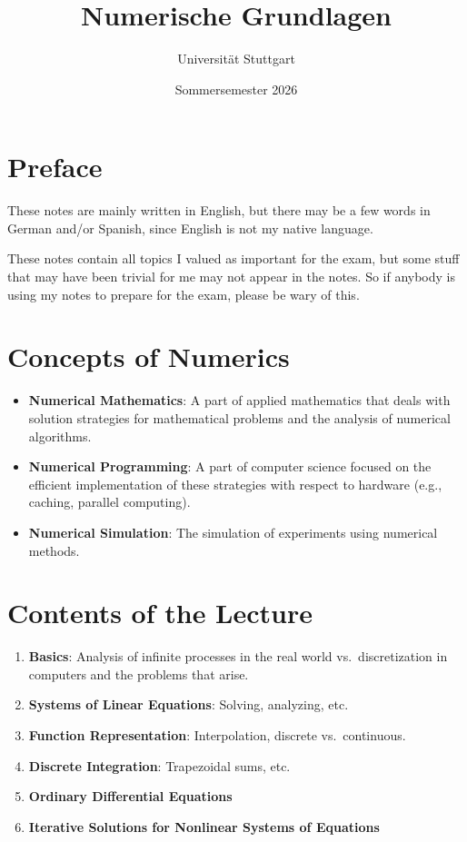 \documentclass{article}
\begin{document}
\title{Numerische Grundlagen}
\date{Sommersemester 2026}
\author{Universität Stuttgart}
\maketitle
\tableofcontents
\newpage
\section{Preface}
These notes are mainly written in English, but there may be a few words in German and/or Spanish, since English is not my native language.

These notes contain all topics I valued as important for the exam, but some stuff that may have been trivial for me may not appear in the notes. So if anybody is using my notes to 
prepare for the exam, please be wary of this.

\section{Concepts of Numerics}
\begin{itemize}
  \item \textbf{Numerical Mathematics}: A part of applied mathematics that deals with solution strategies for mathematical problems and the analysis of numerical algorithms.
  \item \textbf{Numerical Programming}: A part of computer science focused on the efficient implementation of these strategies with respect to hardware (e.g., caching, parallel computing).
  \item \textbf{Numerical Simulation}: The simulation of experiments using numerical methods.
\end{itemize}

\section{Contents of the Lecture}
\begin{enumerate}
  \item \textbf{Basics}: Analysis of infinite processes in the real world vs.\ discretization in computers and the problems that arise.
  \item \textbf{Systems of Linear Equations}: Solving, analyzing, etc.
  \item \textbf{Function Representation}: Interpolation, discrete vs.\ continuous.
  \item \textbf{Discrete Integration}: Trapezoidal sums, etc.
  \item \textbf{Ordinary Differential Equations}
  \item \textbf{Iterative Solutions for Nonlinear Systems of Equations}
\end{enumerate}
\end{document}
